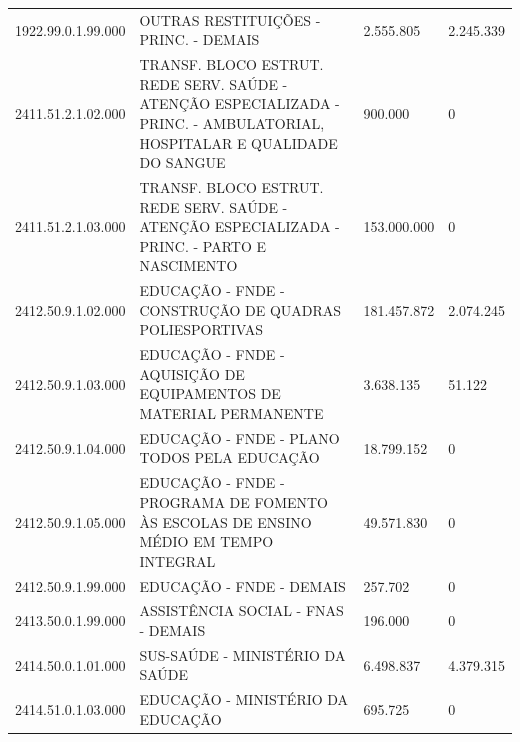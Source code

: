 \documentclass{article}
\begin{document}
\begin{longtable}[c]{m{2cm}|m{11cm}|m{2cm}m{2cm}}
\multicolumn{1}{C{2cm}|}{1922.99.0.1.99.000} & \multicolumn{1}{L{11cm}|}{OUTRAS RESTITUIÇÕES - PRINC. - DEMAIS} & \multicolumn{1}{R{2cm}|}{2.555.805} & \multicolumn{1}{R{2cm}}{2.245.339} \\
\multicolumn{1}{C{2cm}|}{2411.51.2.1.02.000} & \multicolumn{1}{L{11cm}|}{TRANSF. BLOCO ESTRUT. REDE SERV. SAÚDE - ATENÇÃO ESPECIALIZADA - PRINC. - AMBULATORIAL, HOSPITALAR E QUALIDADE DO SANGUE} & \multicolumn{1}{R{2cm}|}{900.000} & \multicolumn{1}{R{2cm}}{            0} \\
\multicolumn{1}{C{2cm}|}{2411.51.2.1.03.000} & \multicolumn{1}{L{11cm}|}{TRANSF. BLOCO ESTRUT. REDE SERV. SAÚDE - ATENÇÃO ESPECIALIZADA - PRINC. - PARTO E NASCIMENTO} & \multicolumn{1}{R{2cm}|}{153.000.000} & \multicolumn{1}{R{2cm}}{            0} \\
\multicolumn{1}{C{2cm}|}{2412.50.9.1.02.000} & \multicolumn{1}{L{11cm}|}{EDUCAÇÃO - FNDE - CONSTRUÇÃO DE QUADRAS POLIESPORTIVAS} & \multicolumn{1}{R{2cm}|}{181.457.872} & \multicolumn{1}{R{2cm}}{2.074.245} \\
\multicolumn{1}{C{2cm}|}{2412.50.9.1.03.000} & \multicolumn{1}{L{11cm}|}{EDUCAÇÃO - FNDE - AQUISIÇÃO DE EQUIPAMENTOS DE MATERIAL PERMANENTE} & \multicolumn{1}{R{2cm}|}{3.638.135} & \multicolumn{1}{R{2cm}}{51.122} \\
\multicolumn{1}{C{2cm}|}{2412.50.9.1.04.000} & \multicolumn{1}{L{11cm}|}{EDUCAÇÃO - FNDE - PLANO TODOS PELA EDUCAÇÃO} & \multicolumn{1}{R{2cm}|}{18.799.152} & \multicolumn{1}{R{2cm}}{            0} \\
\multicolumn{1}{C{2cm}|}{2412.50.9.1.05.000} & \multicolumn{1}{L{11cm}|}{EDUCAÇÃO - FNDE - PROGRAMA DE FOMENTO ÀS ESCOLAS DE ENSINO MÉDIO EM TEMPO INTEGRAL} & \multicolumn{1}{R{2cm}|}{49.571.830} & \multicolumn{1}{R{2cm}}{            0} \\
\multicolumn{1}{C{2cm}|}{2412.50.9.1.99.000} & \multicolumn{1}{L{11cm}|}{EDUCAÇÃO - FNDE - DEMAIS} & \multicolumn{1}{R{2cm}|}{257.702} & \multicolumn{1}{R{2cm}}{            0} \\
\multicolumn{1}{C{2cm}|}{2413.50.0.1.99.000} & \multicolumn{1}{L{11cm}|}{ASSISTÊNCIA SOCIAL - FNAS - DEMAIS} & \multicolumn{1}{R{2cm}|}{196.000} & \multicolumn{1}{R{2cm}}{            0} \\
\multicolumn{1}{C{2cm}|}{2414.50.0.1.01.000} & \multicolumn{1}{L{11cm}|}{SUS-SAÚDE - MINISTÉRIO DA SAÚDE} & \multicolumn{1}{R{2cm}|}{6.498.837} & \multicolumn{1}{R{2cm}}{4.379.315} \\
\multicolumn{1}{C{2cm}|}{2414.51.0.1.03.000} & \multicolumn{1}{L{11cm}|}{EDUCAÇÃO - MINISTÉRIO DA EDUCAÇÃO} & \multicolumn{1}{R{2cm}|}{695.725} & \multicolumn{1}{R{2cm}}{            0} \\

\end{longtable}
\end{document}
